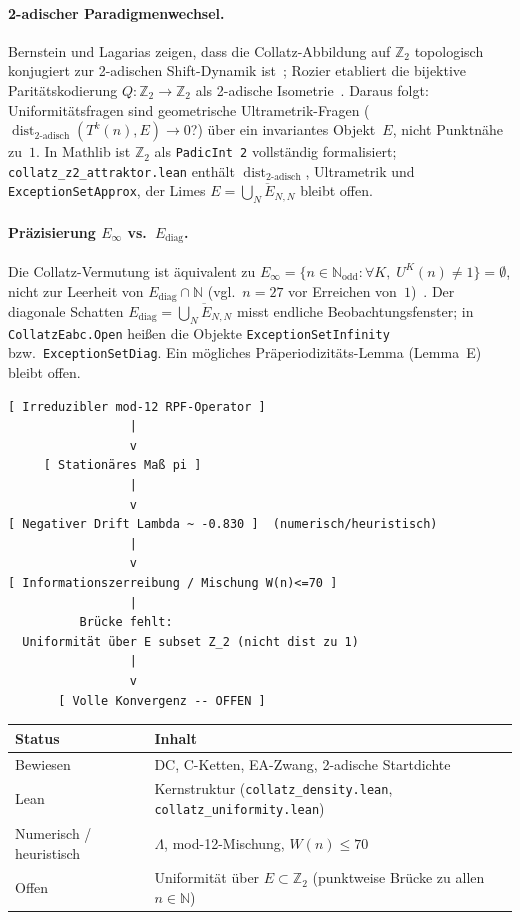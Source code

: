 \documentclass[12pt,a4paper]{article}
\newcommand{\N}{\mathbb{N}}
\newcommand{\Nodd}{\mathbb{N}_{\mathrm{odd}}}
\newcommand{\Ztwo}{\mathbb{Z}_2}
\newcommand{\disttwo}{\operatorname{dist}_{2\text{-adisch}}}
\begin{document}
\paragraph{2-adischer Paradigmenwechsel.}
Bernstein und Lagarias zeigen, dass die Collatz-Abbildung auf $\Ztwo$
topologisch konjugiert zur 2-adischen Shift-Dynamik ist~\cite{BernsteinLagarias1996};
Rozier etabliert die bijektive Paritätskodierung $Q:\Ztwo\to\Ztwo$ als
2-adische Isometrie~\cite{Rozier2019}.
Daraus folgt: Uniformitätsfragen sind geometrische Ultrametrik-Fragen
($\disttwo(T^k(n),E)\to 0$?) über ein invariantes Objekt~$E$, nicht
Punktnähe zu~$1$.
In Mathlib ist $\Ztwo$ als \texttt{PadicInt~2} vollständig formalisiert;
\texttt{collatz\_z2\_attraktor.lean} enthält $\disttwo$, Ultrametrik und
\texttt{ExceptionSetApprox}, der Limes $E=\overline{\bigcup_N E_{N,N}}$ bleibt offen.

\paragraph{Präzisierung $E_\infty$ vs.\ $E_{\mathrm{diag}}$.}
Die Collatz-Vermutung ist äquivalent zu
$E_\infty=\{n\in\Nodd:\forall K,\;U^K(n)\neq 1\}=\emptyset$,
nicht zur Leerheit von $E_{\mathrm{diag}}\cap\N$
(vgl.\ $n=27$ vor Erreichen von~$1$)~\cite{HoffbauerEinfty2026}.
Der diagonale Schatten $E_{\mathrm{diag}}=\overline{\bigcup_N E_{N,N}}$
misst endliche Beobachtungsfenster; in \texttt{CollatzEabc.Open} heißen die
Objekte \texttt{ExceptionSetInfinity} bzw.\ \texttt{ExceptionSetDiag}.
Ein mögliches Präperiodizitäts-Lemma (Lemma~E) bleibt offen.

\begin{center}
\begin{verbatim}
[ Irreduzibler mod-12 RPF-Operator ]
                 |
                 v
     [ Stationäres Maß pi ]
                 |
                 v
[ Negativer Drift Lambda ~ -0.830 ]  (numerisch/heuristisch)
                 |
                 v
[ Informationszerreibung / Mischung W(n)<=70 ]
                 |
          Brücke fehlt:
  Uniformität über E subset Z_2 (nicht dist zu 1)
                 |
                 v
       [ Volle Konvergenz -- OFFEN ]
\end{verbatim}
\end{center}

\begin{center}
\renewcommand{\arraystretch}{1.35}
\begin{tabular}{@{}ll@{}}
\toprule
\textbf{Status} & \textbf{Inhalt} \\
\midrule
Bewiesen & DC, C-Ketten, EA-Zwang, 2-adische Startdichte \\
Lean & Kernstruktur (\texttt{collatz\_density.lean}, \texttt{collatz\_uniformity.lean}) \\
Numerisch / heuristisch & $\Lambda$, mod-12-Mischung, $W(n)\leq 70$ \\
Offen & Uniformität über $E\subset\Ztwo$ (punktweise Brücke zu allen $n\in\N$) \\
\bottomrule
\end{tabular}
\end{center}
\end{document}
